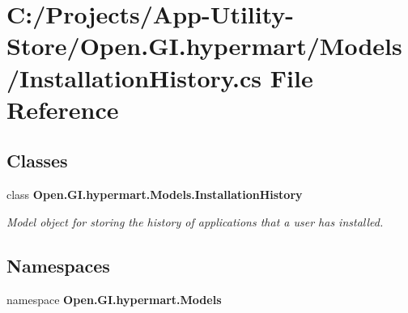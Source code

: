 \section{C\+:/\+Projects/\+App-\/\+Utility-\/\+Store/\+Open.G\+I.\+hypermart/\+Models/\+Installation\+History.cs File Reference}
\label{_installation_history_8cs}
\subsection*{Classes}
\begin{DoxyCompactItemize}
\item 
class \textbf{ Open.\+G\+I.\+hypermart.\+Models.\+Installation\+History}
\begin{DoxyCompactList}\small\item\em Model object for storing the history of applications that a user has installed. \end{DoxyCompactList}\end{DoxyCompactItemize}
\subsection*{Namespaces}
\begin{DoxyCompactItemize}
\item 
namespace \textbf{ Open.\+G\+I.\+hypermart.\+Models}
\end{DoxyCompactItemize}
